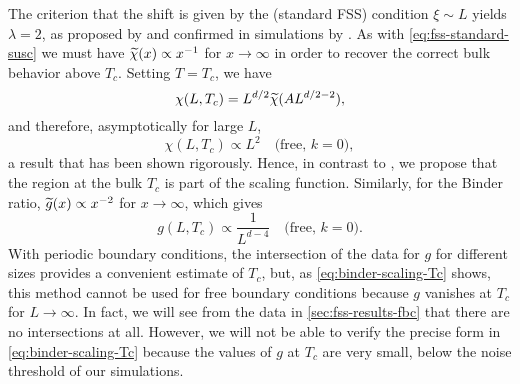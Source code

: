 The criterion that the shift is given by the (standard FSS) condition $\xi \sim
L$ yields $\lambda=2$, as proposed by \textcite{rudnick1985effect} and
confirmed in simulations by \textcite{berche2012hyperscaling,kenna2013new}. As
with \cref{eq:fss-standard-susc} we must have $\widetilde{\chi}(x) \propto
x^{-1}$ for $x \to \infty$ in order to recover the correct bulk behavior above
$T_c$. Setting $T=T_c$, we have
\begin{equation}
  \chi(L,T_c) = L^{d/2}\widetilde{\chi}(A L^{d/2-2}),
\end{equation}
and therefore, asymptotically for large $L$,
\begin{equation}
  \chi(L,T_c) \propto L^2
  \quad\text{(free, $k=0$)},
  \label{eq:rounding-k0-Tc}
\end{equation}
a result that has been shown rigorously.
Hence, in contrast to \textcite{berche2012hyperscaling}, we propose that the
region at the bulk $T_c$ is part of the scaling function.
Similarly, for the Binder ratio, $\widetilde{g}(x) \propto x^{-2}$
for $x\to\infty$, which gives
\begin{equation}
  g(L,T_c) \propto \frac{1}{L^{d-4}}
  \quad\text{(free, $k=0$)}.
  \label{eq:binder-scaling-Tc}
\end{equation}
With periodic boundary conditions, the intersection of the data for $g$ for
different sizes provides a convenient estimate of $T_c$, but, as
\cref{eq:binder-scaling-Tc} shows, this method cannot be used for free boundary
conditions because $g$ vanishes at $T_c$ for $L\to\infty$. In fact, we will see
from the data in \cref{sec:fss-results-fbc} that there are no intersections at
all. However, we will not be able to verify the precise form in
\cref{eq:binder-scaling-Tc} because the values of $g$ at $T_c$ are very small,
below the noise threshold of our simulations.

